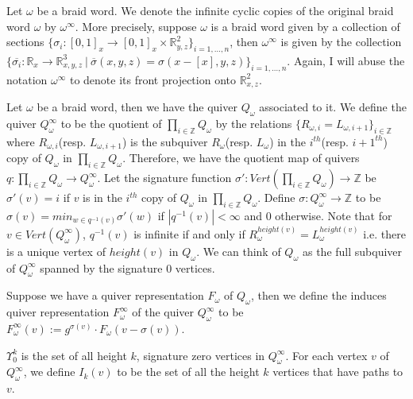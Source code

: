 \begin{definition}
	Let $\omega$ be a braid word. We denote the infinite cyclic copies of the original braid word $\omega$ by $\omega^\infty$. More precisely, suppose $\omega$ is a braid word given by a collection of sections $\{\sigma_i : [0,1]_x\rightarrow [0,1]_x\times \mathbb{R}^2_{y,z}\}_{i =1,\dots,n}$, then $\omega^\infty$ is given by the collection $\{\overline{\sigma_i} : \mathbb{R}_x\rightarrow \mathbb{R}^3_{x,y,z} ~|~ \overline{\sigma}(x,y,z) = \sigma(x-[x],y,z)\}_{i =1,\dots,n}$. Again, I will abuse the notation $\omega^\infty$ to denote its front projection onto $\mathbb{R}^2_{x,z}$. 
\end{definition}	
	
	
	
\begin{definition}	
	Let $\omega$ be a braid word, then we have the quiver $Q_\omega$ associated to it. We define the quiver $Q_\omega^\infty$ to be the quotient of  $\prod_{i \in \mathbb{Z}} Q_\omega$ by the relations $\{R_{\omega,i} = L_{\omega,i+1}\}_{i\in \mathbb{Z}}$ where $R_{\omega,i}$(resp. $L_{\omega,i+1}$) is the subquiver $R_{\omega}$(resp. $L_{\omega}$) in the $i^{th}$(resp. $i+1^{th}$) copy of $Q_\omega$ in $\prod_{i \in \mathbb{Z}} Q_\omega$. Therefore, we have the quotient map of quivers $q : \prod_{i \in \mathbb{Z}} Q_\omega \rightarrow Q_\omega^\infty$. Let the signature function $\sigma' : Vert(\prod_{i \in \mathbb{Z}} Q_\omega) \rightarrow \mathbb{Z}$ be $\sigma'(v) = i$ if $v$ is in the $i^{th}$ copy of $Q_\omega$ in $\prod_{i \in \mathbb{Z}} Q_\omega$. Define $\sigma : Q_\omega^\infty \rightarrow \mathbb{Z}$ to be $\sigma(v) = min_{w\in q^{-1}(v)} \sigma'(w)$ if $|q^{-1}(v)| < \infty$ and $0$ otherwise. Note that for $v\in Vert(Q_\omega^\infty)$, $q^{-1}(v)$ is infinite if and only if $R_\omega^{height(v)} = L_\omega^{height(v)}$ i.e. there is a unique vertex of $height(v)$ in $Q_\omega$. We can think of $Q_\omega$ as the full subquiver of $Q_\omega^\infty$ spanned by the signature $0$ vertices. 
\end{definition}

\begin{definition}	
Suppose we have a quiver representation $F_\omega$ of $Q_\omega$, then we define the induces quiver representation $F^{\infty}_{\omega}$ of the quiver $Q^{\infty}_{\omega}$ to be $F_\omega^\infty(v) := g^{\sigma(v)}\cdot F_\omega(v - \sigma(v))$. 
\end{definition}	

\begin{definition}
$\Upsilon^k_0$ is the set of all height $k$, signature zero vertices in $Q^{\infty}_{\omega}$. For each vertex $v$ of $Q^{\infty}_{\omega}$, we define $I_k(v)$ to be the set of all the height $k$ vertices that have paths to $v$.
\end{definition}

